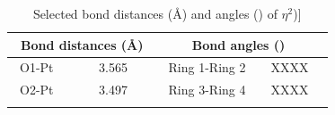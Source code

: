 \begin{table}[htp]
\caption[Selected bond distances (\AA) and angles (\degrees) of \ce{[Rh(tBu-xantphos)Cl(}$\eta^2$){]}]{Selected bond distances (\AA) and angles (\degrees) of \ce{[Rh(tBu-xantphos)Cl(}$\eta^2$)]}
\label{crystal:rhodium:lengths}
\begin{center}
\begin{tabular}{l l l l}
	\toprule
	\multicolumn{2}{l}{\bfseries{~Bond distances (\si{\angstrom})}} & \multicolumn{2}{c}{\bfseries{Bond angles (\degrees)}} \\
	\midrule		
	~O1-Pt		~~&~~3.565~~	&~~Ring 1-Ring 2		&~~XXXX~~		\\
	~O2-Pt		~~&~~3.497~~	&~~Ring 3-Ring 4		&~~XXXX~~		\\
	\bottomrule{}
\end{tabular}
\end{center}
\end{table}

